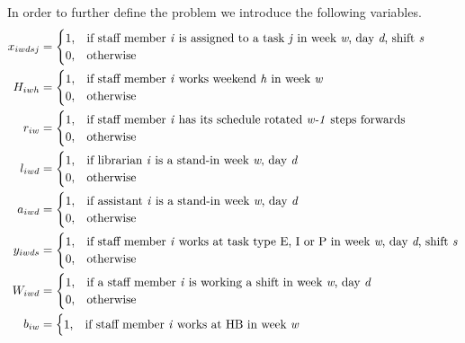 In order to further define the problem we introduce the following variables.
\begin{align}
    x_{iwdsj}&=
    \begin{cases}
      1, & \text{if staff member \textit{i} is assigned to a task \textit{j} in week \textit{w}, day \textit{d}, shift \textit{s}}\\
      0, & \text{otherwise}
    \end{cases}
    \\
    H_{iwh}&=
    \begin{cases}
      1, & \text{if staff member \textit{i} works weekend \textit{h} in week \textit{w}}\\
      0, & \text{otherwise}
    \end{cases}
	\\
	r_{iw}&=
	\begin{cases}
		1, & \text{if staff member \textit{i} has its schedule rotated \textit{w-1} steps forwards}\\
		0, & \text{otherwise}
	\end{cases}
	\\
	l_{iwd}&=
	\begin{cases}
	  1, & \text{if librarian \textit{i} is a stand-in week \textit{w}, day \textit{d}} \\
	  0, & \text{otherwise}
	\end{cases}
	\\
	a_{iwd}&=
	\begin{cases}
 		1, & \text{if assistant \textit{i} is a stand-in week \textit{w}, day \textit{d}} \\
 		0, & \text{otherwise}
	\end{cases}
	\\
	y_{iwds}&=
	\begin{cases}
 		1, & \text{if staff member \textit{i} works at task type E, I or P in week \textit{w}, day \textit{d}, shift \textit{s}} \\
 		0, & \text{otherwise}
	\end{cases}
	\\
	W_{iwd}&=
	\begin{cases}
	 	1, & \text{if a staff member \textit{i} is working a shift in week \textit{w}, day \textit{d}} \\
	 	0, & \text{otherwise}
	\end{cases}
	\\
	b_{iw}&=
	\begin{cases}
 		1, & \text{if staff member \textit{i} works at HB in week \textit{w}} \\

\end{cases}
\end{align}
